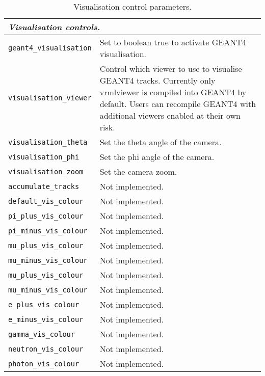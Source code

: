 \begin{table*}
\begin{center}
\caption{Visualisation control parameters.}
\begin{tabularx}{\textwidth}{lX}
\hline
\multicolumn{2}{l}{\emph{Visualisation controls.}} \\
\hline
\verb|geant4_visualisation| & Set to boolean true to activate GEANT4 visualisation.\\
\verb|visualisation_viewer| & Control which viewer to use to visualise GEANT4 tracks. Currently only vrmlviewer is compiled into GEANT4 by default. Users can recompile GEANT4 with additional viewers enabled at their own risk.\\
\verb|visualisation_theta| & Set the theta angle of the camera.\\
\verb|visualisation_phi| & Set the phi angle of the camera.\\
\verb|visualisation_zoom| & Set the camera zoom.\\
\verb|accumulate_tracks| & Not implemented.\\
\verb|default_vis_colour| & Not implemented.\\
\verb|pi_plus_vis_colour| & Not implemented.\\
\verb|pi_minus_vis_colour| & Not implemented.\\
\verb|mu_plus_vis_colour| & Not implemented.\\
\verb|mu_minus_vis_colour| & Not implemented.\\
\verb|mu_plus_vis_colour| & Not implemented.\\
\verb|mu_minus_vis_colour| & Not implemented.\\
\verb|e_plus_vis_colour| & Not implemented.\\
\verb|e_minus_vis_colour| & Not implemented.\\
\verb|gamma_vis_colour| & Not implemented.\\
\verb|neutron_vis_colour| & Not implemented.\\
\verb|photon_vis_colour| & Not implemented.\\
\end{tabularx}
\end{center}
\end{table*}


